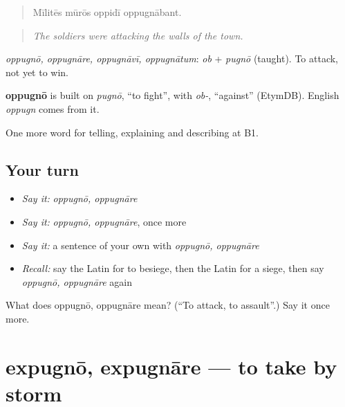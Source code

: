 \begin{quote}
Mīlitēs mūrōs oppidī oppugnābant.
\end{quote}

\begin{quote}
\emph{The soldiers were attacking the walls of the town.}
\end{quote}

\emph{oppugnō, oppugnāre, oppugnāvī, oppugnātum}: \emph{ob} + \emph{pugnō} (taught). To attack, not yet to win.

\begin{cousinweb}
\textbf{oppugnō} is built on \emph{pugnō}, \textquotedblleft{}to fight\textquotedblright{}, with \emph{ob-}, \textquotedblleft{}against\textquotedblright{} (EtymDB). English \emph{oppugn} comes from it.
\end{cousinweb}

\begin{grammarlens}[title={What you've built}]
One more word for telling, explaining and describing at B1.
\end{grammarlens}

\subsection*{Your turn}
\begin{itemize}
\raggedright
  \item \emph{Say it:} \emph{oppugnō, oppugnāre}
  \item \emph{Say it:} \emph{oppugnō, oppugnāre}, once more
  \item \emph{Say it:} a sentence of your own with \emph{oppugnō, oppugnāre}
  \item \emph{Recall:} say the Latin for to besiege, then the Latin for a siege, then say \emph{oppugnō, oppugnāre} again
\end{itemize}

\begin{tcolorbox}[breakable,colback=teal!4,colframe=teal!35!black,title={Before you move on}]
What does oppugnō, oppugnāre mean? (\textquotedblleft{}To attack, to assault\textquotedblright{}.) Say it once more.
\end{tcolorbox}
\section[expugnō, expugnāre]{expugnō, expugnāre — to take by storm}

\label{lesson:LA-C341-expugno}



